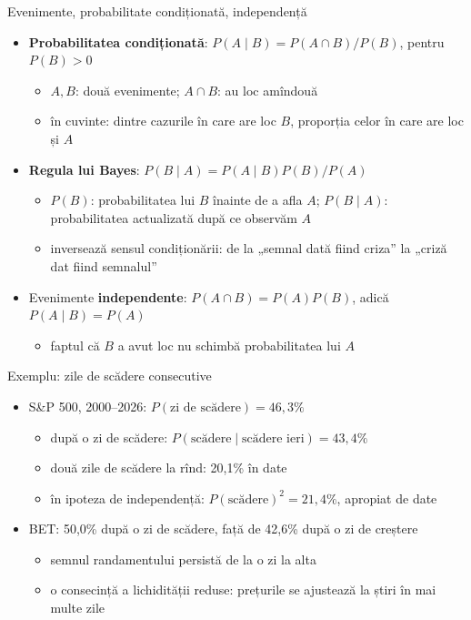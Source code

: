 \begin{frame}{Evenimente, probabilitate condiționată, independență}
\itemsize{\footnotesize}
\begin{itemize}
    \item \textbf{Probabilitatea condiționată}: $P(A \mid B) = P(A \cap B)/P(B)$, pentru $P(B) > 0$
    \begin{itemize}
        \item $A, B$: două evenimente; $A \cap B$: au loc amîndouă
        \item în cuvinte: dintre cazurile în care are loc $B$, proporția celor în care are loc și $A$
    \end{itemize}
    \item \textbf{Regula lui Bayes}: $P(B \mid A) = P(A \mid B)P(B)/P(A)$
    \begin{itemize}
        \item $P(B)$: probabilitatea lui $B$ înainte de a afla $A$; $P(B \mid A)$: probabilitatea actualizată după ce observăm $A$
        \item inversează sensul condiționării: de la „semnal dată fiind criza” la „criză dat fiind semnalul”
    \end{itemize}
    \item Evenimente \textbf{independente}: $P(A \cap B) = P(A)P(B)$, adică $P(A \mid B) = P(A)$
    \begin{itemize}
        \item faptul că $B$ a avut loc nu schimbă probabilitatea lui $A$
    \end{itemize}
\end{itemize}
\end{frame}

\begin{frame}{Exemplu: zile de scădere consecutive}
\itemsize{\small}
\begin{itemize}
    \item S\&P 500, 2000--2026: $P(\text{zi de scădere}) = 46{,}3\%$
    \begin{itemize}
        \item după o zi de scădere: $P(\text{scădere} \mid \text{scădere ieri}) = 43{,}4\%$
        \item două zile de scădere la rînd: 20{,}1\% în date
        \item în ipoteza de independență: $P(\text{scădere})^2 = 21{,}4\%$, apropiat de date
    \end{itemize}
    \item BET: 50{,}0\% după o zi de scădere, față de 42{,}6\% după o zi de creștere
    \begin{itemize}
        \item semnul randamentului persistă de la o zi la alta
        \item o consecință a lichidității reduse: prețurile se ajustează la știri în mai multe zile
    \end{itemize}
\end{itemize}
\end{frame}

